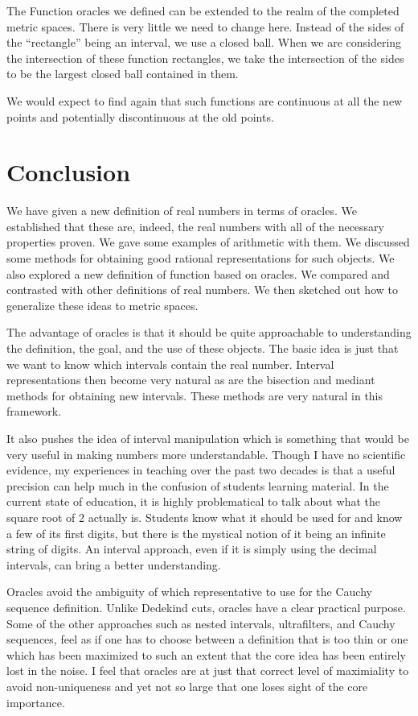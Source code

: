 \documentclass[12pt]{article}
\theoremstyle{remark}
\begin{document}
The Function oracles we defined can be extended to the realm of the completed metric spaces. There is very little we need to change here. Instead of the sides of the ``rectangle'' being an interval, we use a closed ball. When we are considering the intersection of these function rectangles, we take the intersection of the sides to be the largest closed ball contained in them. 

We would expect to find again that such functions are continuous at all the new points and potentially discontinuous at the old points. 

\section{Conclusion}

We have given a new definition of real numbers in terms of oracles. We established that these are, indeed, the real numbers with all of the necessary properties proven. We gave some examples of arithmetic with them. We discussed some methods for obtaining good rational representations for such objects. We also explored a new definition of function based on oracles. We compared and contrasted with other definitions of real numbers. We then sketched out how to generalize these ideas to metric spaces. 

The advantage of oracles is that it should be quite approachable to understanding the definition, the goal, and the use of these objects. The basic idea is just that we want to know which intervals contain the real number. Interval representations then become very natural as are the bisection and mediant methods for obtaining new intervals. These methods are very natural in this framework. 

It also pushes the idea of interval manipulation which is something that would be very useful in making numbers more understandable. Though I have no scientific evidence, my experiences in teaching over the past two decades is that a useful precision can help much in the confusion of students learning material. In the current state of education, it is highly problematical to talk about what the square root of 2 actually is. Students know what it should be used for and know a few of its first digits, but there is the mystical notion of it being an infinite string of digits. An interval approach, even if it is simply using the decimal intervals, can bring a better understanding. 

Oracles avoid the ambiguity of which representative to use for the Cauchy sequence definition. Unlike Dedekind cuts, oracles have a clear practical purpose. Some of the other approaches such as nested intervals, ultrafilters, and Cauchy sequences, feel as if one has to choose between a definition that is too thin or one which has been maximized to such an extent that the core idea has been entirely lost in the noise. I feel that oracles are at just that correct level of maximiality to avoid non-uniqueness and yet not so large that one loses sight of the core importance.  
\end{document}
